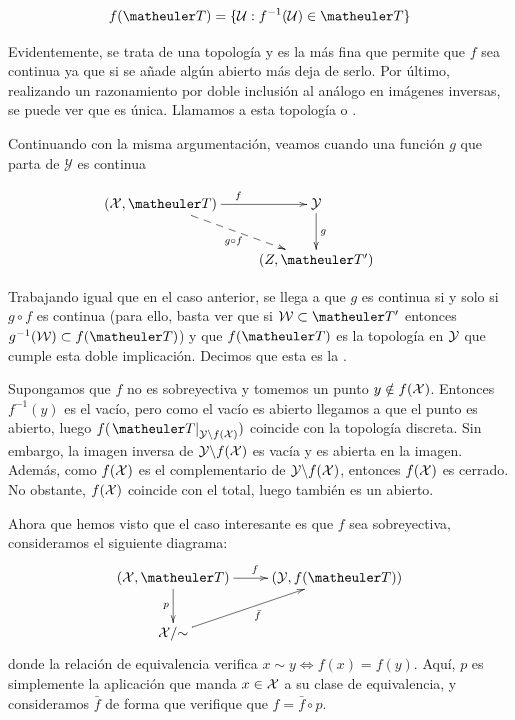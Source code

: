 \[f(\T)=\{\U: f^{-1}(\U)\in \T\}\]

Evidentemente, se trata de una topología y es la más fina que permite que $f$ sea continua ya que si se añade algún abierto más deja de serlo. Por último, realizando un razonamiento por doble inclusión al análogo en imágenes inversas, se puede ver que es única. Llamamos a esta topología  o .

Continuando con la misma argumentación, veamos cuando una función $g$ que parta de $\mathcal{Y}$ es continua

\begin{equation}
\label{cont_propiedad_universal_top_imagen}
\xymatrix{
	(\mathcal{\X},\T) \ar[r]^f \ar@{-->}[rd]_{g\circ f} &
	\mathcal{\Y} \ar[d]^g & \\
	&(Z,\T')}
\end{equation}

Trabajando igual que en el caso anterior, se llega a que $g$ es continua si y solo si $g\circ f$ es continua (para ello, basta ver que si $\W\subset \T'$ entonces $g^{-1}(\W)\subset f(\T)$) y que $f(\T)$ es la topología en $\mathcal{\mathcal{Y}}$ que cumple esta doble implicación. Decimos que esta es la .

\begin{obs}[Sobreyectividad]
	
	Supongamos que $f$ no es sobreyectiva y tomemos un punto $y\notin f(\mathcal{\mathcal{X}})$. Entonces $f^{-1}(y)$ es el vacío, pero como el vacío es abierto llegamos a que el punto es abierto, luego $f(\left.\T\right|_{\mathcal{\Y}\backslash f(\mathcal{\X})})$ coincide con la topología discreta. Sin embargo, la imagen inversa de $\mathcal{\mathcal{Y}}\backslash f(\mathcal{\mathcal{X}})$ es vacía y es abierta en la imagen. Además, como $f(\mathcal{\mathcal{X}})$ es el complementario de $\mathcal{\mathcal{Y}}\backslash f(\mathcal{\mathcal{X}})$, entonces $f(\mathcal{\mathcal{X}})$ es cerrado. No obstante, $f(\mathcal{\mathcal{X}})$ coincide con el total, luego también es un abierto. 	
\end{obs}

Ahora que hemos visto que el caso interesante es que $f$ sea sobreyectiva, consideramos el siguiente diagrama:
\[\xymatrix{
	(\X,\T) \ar[r]^{f} \ar[d]_{p} &
	(\mc{Y}, f(\T)) \\
	\X/\mathord{\sim}  \ar[ru]_{\bar{f}}
}\]
donde la relación de equivalencia verifica $x\sim y\iff f(x)=f(y)$. Aquí, $p$ es simplemente la aplicación que manda $x\in\mathcal{X}$ a su clase de equivalencia, y consideramos $\bar{f}$ de forma que verifique que $f=\bar{f}\circ p$.


